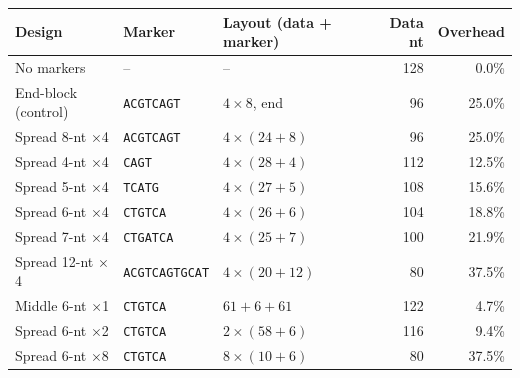 \begin{tabular}{lllrr}
\hline
Design & Marker & Layout (data + marker) & Data nt & Overhead \\
\hline
No markers & -- & -- & 128 & 0.0\% \\
End-block (control) & \texttt{ACGTCAGT} & $4\times8$, end & 96 & 25.0\% \\
Spread 8-nt $\times$4 & \texttt{ACGTCAGT} & $4\times(24+8)$ & 96 & 25.0\% \\
Spread 4-nt $\times$4 & \texttt{CAGT} & $4\times(28+4)$ & 112 & 12.5\% \\
Spread 5-nt $\times$4 & \texttt{TCATG} & $4\times(27+5)$ & 108 & 15.6\% \\
Spread 6-nt $\times$4 & \texttt{CTGTCA} & $4\times(26+6)$ & 104 & 18.8\% \\
Spread 7-nt $\times$4 & \texttt{CTGATCA} & $4\times(25+7)$ & 100 & 21.9\% \\
Spread 12-nt $\times$4 & \texttt{ACGTCAGTGCAT} & $4\times(20+12)$ & 80 & 37.5\% \\
Middle 6-nt $\times$1 & \texttt{CTGTCA} & $61+6+61$ & 122 & 4.7\% \\
Spread 6-nt $\times$2 & \texttt{CTGTCA} & $2\times(58+6)$ & 116 & 9.4\% \\
Spread 6-nt $\times$8 & \texttt{CTGTCA} & $8\times(10+6)$ & 80 & 37.5\% \\
\hline
\end{tabular}
